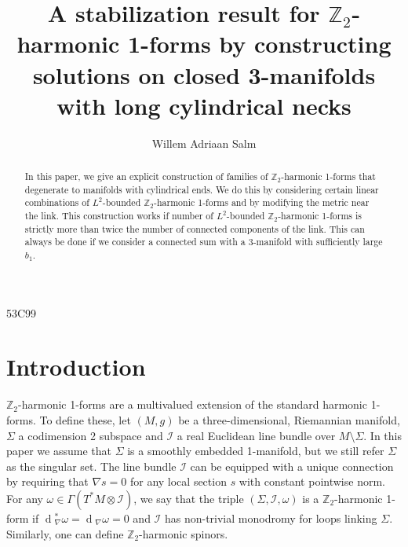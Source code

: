 \documentclass[preprint,12pt]{elsarticle}
\numberwithin{table}{section}
\newcommand{\Z}{\mathbb{Z}}
\renewcommand{\d}{\operatorname{d}\!}
\begin{document}
\begin{frontmatter}

\title{A stabilization result for $\mathbb{Z}_2$-harmonic 1-forms by constructing solutions on closed 3-manifolds with long cylindrical necks}

\author{Willem Adriaan Salm} %


\begin{abstract}
In this paper, we give an explicit construction of families of $\Z_2$-harmonic 1-forms that degenerate to manifolds with cylindrical ends. We do this by considering certain linear combinations of $L^2$-bounded $\Z_2$-harmonic 1-forms and by modifying the metric near the link. This construction works if number of $L^2$-bounded $\Z_2$-harmonic 1-forms is strictly more than twice the number of connected components of the link. This can always be done if we consider a connected sum with a 3-manifold with sufficiently large $b_1$.
\end{abstract}



\begin{keyword}
\MSC 53C99
\end{keyword}

\end{frontmatter}

\section{Introduction}
$\Z_2$-harmonic 1-forms are a multivalued extension of the standard harmonic 1-forms. To define these, let $(M,g)$ be a three-dimensional, Riemannian manifold, $\Sigma$ a codimension 2 subspace and $\mathcal{I}$ a real Euclidean line bundle over $M \setminus \Sigma$. In this paper we assume that $\Sigma$ is a smoothly embedded 1-manifold, but we still refer $\Sigma$ as the singular set. The line bundle $\mathcal{I}$ can be equipped with a unique connection by requiring that $\nabla s = 0$ for any local section $s$ with constant pointwise norm. For any $\omega \in \Gamma(T^*M \otimes \mathcal{I})$, we say that the triple $(\Sigma, \mathcal{I}, \omega)$ is a $\Z_2$-harmonic 1-form if $\d_\nabla^* \omega = \d_\nabla \omega = 0$ and $\mathcal{I}$ has non-trivial monodromy for loops linking $\Sigma$. Similarly, one can define $\Z_2$-harmonic spinors.
\end{document}
